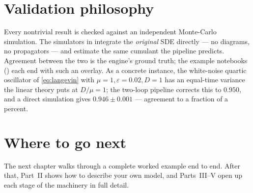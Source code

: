 \section{Validation philosophy}

Every nontrivial result is checked against an independent Monte-Carlo
simulation.  The simulators in  integrate the \emph{original} SDE
directly --- no diagrams, no propagators --- and estimate the same cumulant the
pipeline predicts.  Agreement between the two is the engine's ground truth; the
example notebooks () each end with such an overlay.  As
a concrete instance, the white-noise quartic oscillator of
\eqref{eq:langevin} with $\mu=1,\varepsilon=0.02,D=1$ has an equal-time variance
the linear theory puts at $D/\mu = 1$; the two-loop pipeline corrects this to
$0.950$, and a direct simulation gives $0.946\pm0.001$ --- agreement to a fraction
of a percent.

\section{Where to go next}

The next chapter walks through a complete worked example end to end.  After that,
Part~II shows how to describe your own model, and Parts~III--V open up each stage
of the machinery in full detail.
